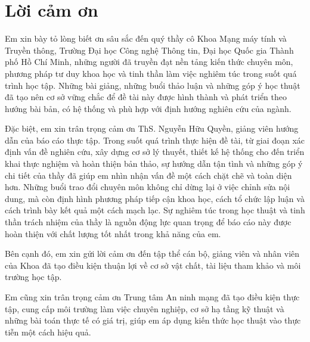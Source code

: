 
\chapter*{Lời cảm ơn}

Em xin bày tỏ lòng biết ơn sâu sắc đến quý thầy cô Khoa Mạng máy tính và Truyền thông, Trường Đại học Công nghệ Thông tin, Đại học Quốc gia Thành phố Hồ Chí Minh, những người đã truyền đạt nền tảng kiến thức chuyên môn, phương pháp tư duy khoa học và tinh thần làm việc nghiêm túc trong suốt quá trình học tập. Những bài giảng, những buổi thảo luận và những góp ý học thuật đã tạo nên cơ sở vững chắc để đề tài này được hình thành và phát triển theo hướng bài bản, có hệ thống và phù hợp với định hướng nghiên cứu của ngành.

Đặc biệt, em xin trân trọng cảm ơn ThS. Nguyễn Hữu Quyền, giảng viên hướng dẫn của báo cáo thực tập. Trong suốt quá trình thực hiện đề tài, từ giai đoạn xác định vấn đề nghiên cứu, xây dựng cơ sở lý thuyết, thiết kế hệ thống cho đến triển khai thực nghiệm và hoàn thiện bản thảo, sự hướng dẫn tận tình và những góp ý chi tiết của thầy đã giúp em nhìn nhận vấn đề một cách chặt chẽ và toàn diện hơn. Những buổi trao đổi chuyên môn không chỉ dừng lại ở việc chỉnh sửa nội dung, mà còn định hình phương pháp tiếp cận khoa học, cách tổ chức lập luận và cách trình bày kết quả một cách mạch lạc. Sự nghiêm túc trong học thuật và tinh thần trách nhiệm của thầy là nguồn động lực quan trọng để báo cáo này được hoàn thiện với chất lượng tốt nhất trong khả năng của em.

Bên cạnh đó, em xin gửi lời cảm ơn đến tập thể cán bộ, giảng viên và nhân viên của Khoa đã tạo điều kiện thuận lợi về cơ sở vật chất, tài liệu tham khảo và môi trường học tập.

Em cũng xin trân trọng cảm ơn Trung tâm An ninh mạng đã tạo điều kiện thực tập, cung cấp môi trường làm việc chuyên nghiệp, cơ sở hạ tầng kỹ thuật và những bài toán thực tế có giá trị, giúp em áp dụng kiến thức học thuật vào thực tiễn một cách hiệu quả.


